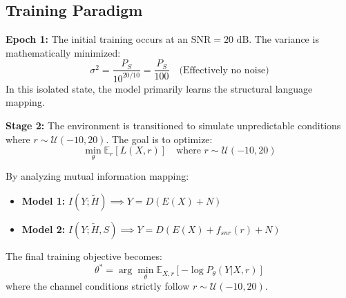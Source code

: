 \documentclass[twocolumn]{article}
\begin{document}
\subsection{\textbf{Training Paradigm}}

\textbf{Epoch 1:} The initial training occurs at an $\text{SNR} = 20\text{ dB}$. The variance is mathematically minimized:
\begin{equation}
    \sigma^2 = \frac{P_S}{10^{20/10}} = \frac{P_S}{100} \quad \text{(Effectively no noise)}
\end{equation}
In this isolated state, the model primarily learns the structural language mapping.

\textbf{Stage 2:} The environment is transitioned to simulate unpredictable conditions where $r \sim \mathcal{U}(-10, 20)$. The goal is to optimize:
\begin{equation}
    \min_\theta \mathbb{E}_r \left[ L(X, r) \right] \quad \text{where } r \sim \mathcal{U}(-10, 20)
\end{equation}

By analyzing mutual information mapping:
\begin{itemize}
    \item \textbf{Model 1:} $I(Y; \tilde{H}) \implies Y = D(E(X) + N)$
    \item \textbf{Model 2:} $I(Y; \tilde{H}, S) \implies \boxed{Y = D(E(X) + f_{snr}(r) + N)}$
\end{itemize}

The final training objective becomes:
\begin{equation}
    \theta^* = \arg\min_\theta \mathbb{E}_{X,r} \left[ -\log P_\theta(Y|X,r) \right]
\end{equation}
where the channel conditions strictly follow $r \sim \mathcal{U}(-10, 20)$.
\end{document}
